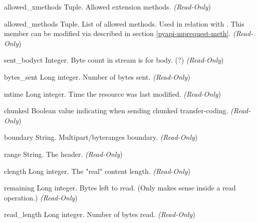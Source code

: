 \begin{memberdesc}[Request]{allowed_xmethods}
Tuple. Allowed extension methods.
\emph{(Read-Only})
\end{memberdesc}

\begin{memberdesc}[Request]{allowed_methods}
Tuple. List of allowed methods. Used in relation with
. This member can be modified via  
described in section \ref{pyapi-mprequest-meth}.
\emph{(Read-Only})
\end{memberdesc}

\begin{memberdesc}[Request]{sent_bodyct}
Integer. Byte count in stream is for body. (?)
\emph{(Read-Only})
\end{memberdesc}

\begin{memberdesc}[Request]{bytes_sent}
Long integer. Number of bytes sent.
\emph{(Read-Only})
\end{memberdesc}

\begin{memberdesc}[Request]{mtime}
Long integer. Time the resource was last modified.
\emph{(Read-Only})
\end{memberdesc}

\begin{memberdesc}[Request]{chunked}
Boolean value indicating when sending chunked transfer-coding.
\emph{(Read-Only})
\end{memberdesc}

\begin{memberdesc}[Request]{boundary}
String. Multipart/byteranges boundary.
\emph{(Read-Only})
\end{memberdesc}

\begin{memberdesc}[Request]{range}
String. The  header.
\emph{(Read-Only})
\end{memberdesc}

\begin{memberdesc}[Request]{clength}
Long integer. The "real" content length.
\emph{(Read-Only})
\end{memberdesc}

\begin{memberdesc}[Request]{remaining}
Long integer. Bytes left to read. (Only makes sense inside a read
operation.)
\emph{(Read-Only})
\end{memberdesc}

\begin{memberdesc}[Request]{read_length}
Long integer. Number of bytes read.
\emph{(Read-Only})
\end{memberdesc}

